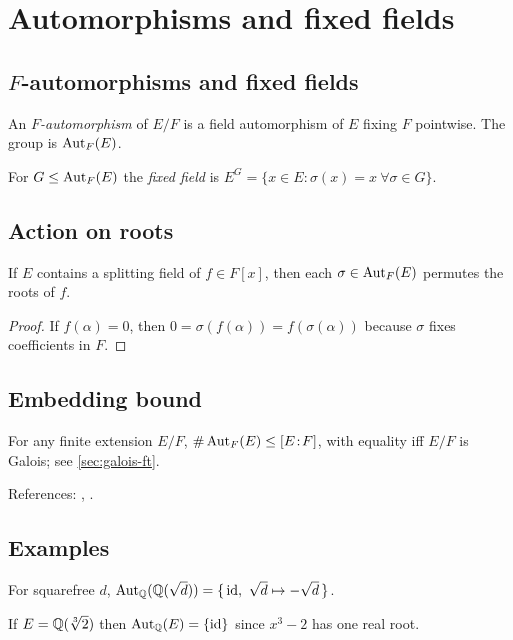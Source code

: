 \section{Automorphisms and fixed fields}\label{sec:autos-fixed}

\subsection{$F$-automorphisms and fixed fields}
\begin{definition}
An \emph{$F$-automorphism} of $E/F$ is a field automorphism of $E$ fixing $F$ pointwise. The group is $\operatorname{Aut}_F(E)$.
\end{definition}
\begin{definition}
For $G\le \operatorname{Aut}_F(E)$ the \emph{fixed field} is $E^G=\{x\in E:\sigma(x)=x\ \forall\sigma\in G\}$.
\end{definition}

\subsection{Action on roots}
\begin{proposition}\label{prop:permute-roots}
If $E$ contains a splitting field of $f\in F[x]$, then each $\sigma\in\operatorname{Aut}_F(E)$ permutes the roots of $f$.
\end{proposition}
\begin{proof}
If $f(\alpha)=0$, then $0=\sigma(f(\alpha))=f(\sigma(\alpha))$ because $\sigma$ fixes coefficients in $F$.
\end{proof}

\subsection{Embedding bound}
\begin{theorem}\label{thm:autobound}
For any finite extension $E/F$, $\#\operatorname{Aut}_F(E)\le [E\!:\!F]$, with equality iff $E/F$ is Galois; see \cref{sec:galois-ft}.
\end{theorem}
References: \cite[\S14]{DF}, \cite[Ch.~V]{Artin}.

\subsection{Examples}
\begin{example}[Quadratic]
For squarefree $d$, $\operatorname{Aut}_{\mathbb{Q}}(\mathbb{Q}(\sqrt d))=\{\,\mathrm{id},\ \sqrt d\mapsto-\sqrt d\,\}$.
\end{example}
\begin{example}
If $E=\Q(\root3\of2)$ then $\operatorname{Aut}_{\mathbb{Q}}(E)=\{\mathrm{id}\}$ since $x^3-2$ has one real root.
\end{example}
